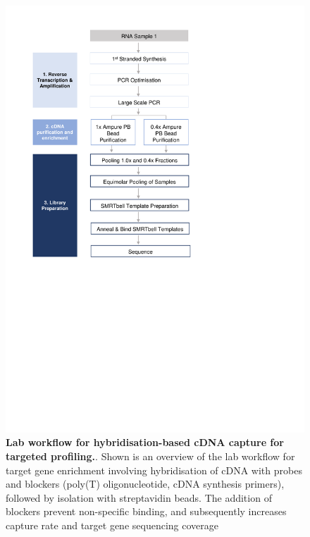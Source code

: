\begin{figure}[!h]
	\begin{center}
		\includegraphics[page=12,trim={0cm 6cm 0cm 1cm},clip,scale = 0.70]{Figures/ProjectDevelopment_Figures.pdf}
	\end{center}
	\captionsetup{width=0.95\textwidth}
	\caption[Lab workflow for hybridisation-based cDNA capture for targeted profiling]%
	{\textbf{Lab workflow for hybridisation-based cDNA capture for targeted profiling.}. Shown is an overview of the lab workflow for target gene enrichment involving hybridisation of cDNA with probes and blockers (poly(T) oligonucleotide, cDNA synthesis primers), followed by isolation with streptavidin beads. The addition of blockers prevent non-specific binding, and subsequently increases capture rate and target gene sequencing coverage}
	\label{fig:isoseq_targetcapture}
\end{figure}

